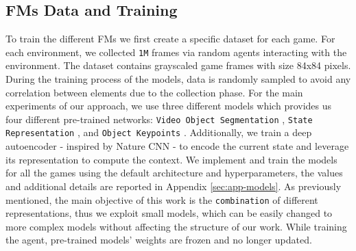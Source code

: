 \subsection{FMs Data and Training}
To train the different FMs we first create a specific dataset for each game. For each environment, we collected \texttt{1M} frames via random agents interacting with the environment. The dataset contains grayscaled game frames with size 84x84 pixels. During the training process of the models, data is randomly sampled to avoid any correlation between elements due to the collection phase. For the main experiments of our approach, we use three different models which provides us four different pre-trained networks: \texttt{Video Object Segmentation} \citep{goel2018unsupervised}, \texttt{State Representation} \citep{anand2019unsupervised}, and \texttt{Object Keypoints} \citep{kulkarni2019unsupervised}. Additionally, we train a deep autoencoder - inspired by Nature CNN \citep{mnih2015human} - to encode the current state and leverage its representation to compute the context. We implement and train the models for all the games using the default architecture and hyperparameters, the values and additional details are reported in Appendix \ref{sec:app-models}. As previously mentioned, the main objective of this work is the \texttt{combination} of different representations, thus we exploit small models, which can be easily changed to more complex models without affecting the structure of our work. While training the agent, pre-trained models' weights are frozen and no longer updated.

